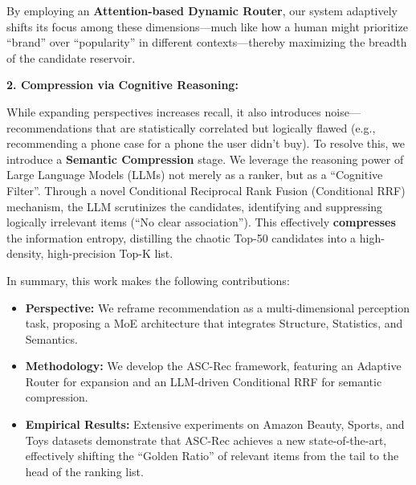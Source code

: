 By employing an \textbf{Attention-based Dynamic Router}, our system adaptively shifts its focus among these dimensions---much like how a human might prioritize ``brand'' over ``popularity'' in different contexts---thereby maximizing the breadth of the candidate reservoir.

\textbf{2. Compression via Cognitive Reasoning:}

While expanding perspectives increases recall, it also introduces noise---recommendations that are statistically correlated but logically flawed (e.g., recommending a phone case for a phone the user didn't buy). To resolve this, we introduce a \textbf{Semantic Compression} stage. We leverage the reasoning power of Large Language Models (LLMs) not merely as a ranker, but as a ``Cognitive Filter''. Through a novel Conditional Reciprocal Rank Fusion (Conditional RRF) mechanism, the LLM scrutinizes the candidates, identifying and suppressing logically irrelevant items (``No clear association''). This effectively \textbf{compresses} the information entropy, distilling the chaotic Top-50 candidates into a high-density, high-precision Top-K list.

In summary, this work makes the following contributions:
\begin{itemize}
    \item \textbf{Perspective:} We reframe recommendation as a multi-dimensional perception task, proposing a MoE architecture that integrates Structure, Statistics, and Semantics.
    \item \textbf{Methodology:} We develop the ASC-Rec framework, featuring an Adaptive Router for expansion and an LLM-driven Conditional RRF for semantic compression.
    \item \textbf{Empirical Results:} Extensive experiments on Amazon Beauty, Sports, and Toys datasets demonstrate that ASC-Rec achieves a new state-of-the-art, effectively shifting the ``Golden Ratio'' of relevant items from the tail to the head of the ranking list.
\end{itemize}